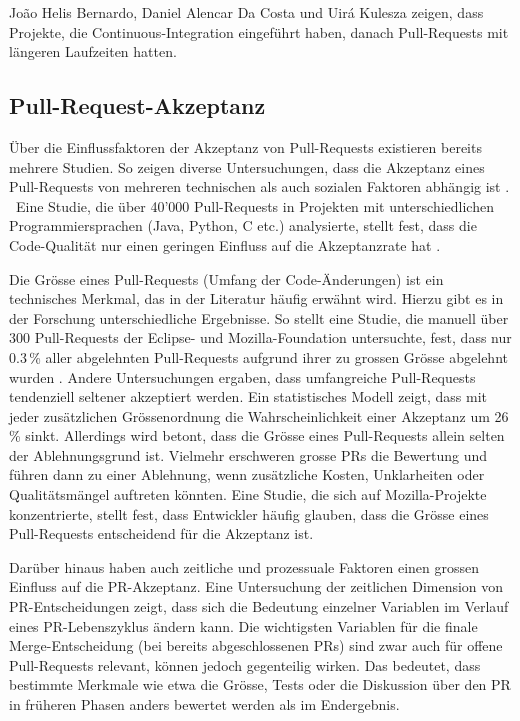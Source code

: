 João Helis Bernardo, Daniel Alencar Da Costa und Uirá Kulesza \parencite{bernardo_studying_2018} zeigen, dass Projekte, die Continuous-Integration eingeführt haben, danach Pull-Requests mit längeren Laufzeiten hatten.

\subsection{Pull-Request-Akzeptanz}
Über die Einflussfaktoren der Akzeptanz von Pull-Reque\-sts existieren bereits mehrere Studien.
So zeigen diverse Untersuchungen, dass die Akzeptanz eines Pull-Requests von mehreren technischen als auch sozialen Faktoren abhängig ist \parencite{gousios_exploratory_2014}. \
Eine Studie, die über 40'000 Pull-Requests in Projekten mit unterschiedlichen Programmiersprachen (Java, Python, C etc.) analysierte, stellt fest, dass die Code-Qualität nur einen geringen Einfluss auf die Akzeptanzrate hat \parencite{kuhejda_pull_2023}.

Die Grösse eines Pull-Requests (Umfang der Code-Änderungen) ist ein technisches Merkmal, das in der Literatur häufig erwähnt wird. Hierzu gibt es in der Forschung unterschiedliche Ergebnisse. So stellt eine Studie, die manuell über 300 Pull-Requests der Eclipse- und Mozilla-Foundation untersuchte, fest, dass nur 0.3\,\% aller abgelehnten Pull-Requests aufgrund ihrer zu grossen Grösse abgelehnt wurden \parencite{tao_writing_2014}. Andere Untersuchungen ergaben, dass umfangreiche Pull-Requests tendenziell seltener akzeptiert werden. Ein statistisches Modell zeigt, dass mit jeder zusätzlichen Grössenordnung die Wahrscheinlichkeit einer Akzeptanz um 26\,\% sinkt. Allerdings wird betont, dass die Grösse eines Pull-Re\-quests allein selten der Ablehnungsgrund ist. Vielmehr erschweren grosse PRs die Bewertung und führen dann zu einer Ablehnung, wenn zusätzliche Kosten, Unklarheiten oder Qualitätsmängel auftreten könnten. Eine Studie, die sich auf Mozilla-Projekte konzentrierte, stellt fest, dass Entwickler häufig glauben, dass die Grösse eines Pull-Requests entscheidend für die Akzeptanz ist. \parencite{tsay_influence_2014}

Darüber hinaus haben auch zeitliche und prozessuale Faktoren einen grossen Einfluss auf die PR-Akzeptanz. Eine Untersuchung der zeitlichen Dimension von PR-Entscheidungen zeigt, dass sich die Bedeutung einzelner Variablen im Verlauf eines PR-Lebenszyklus ändern kann. Die wichtigsten Variablen für die finale Merge-Entscheidung (bei bereits abgeschlossenen PRs) sind zwar auch für offene Pull-\linebreak Requests relevant, können jedoch gegenteilig wirken. Das bedeutet, dass bestimmte Merkmale wie etwa die Grösse, Tests oder die Diskussion über den PR in früheren Phasen anders bewertet werden als im Endergebnis. \parencite{west_temporal_2023}


